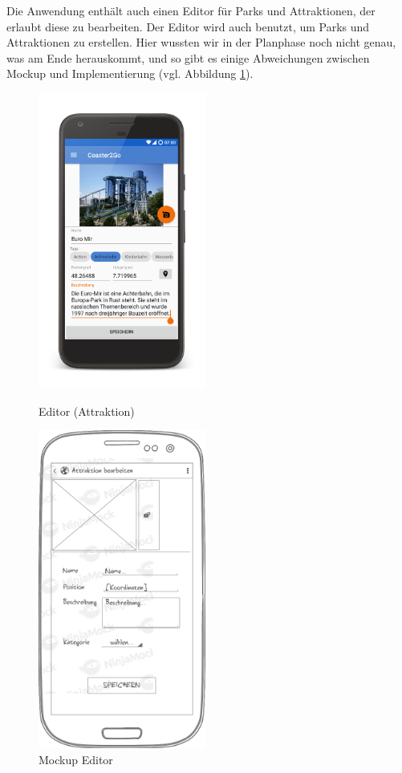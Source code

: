 Die Anwendung enthält auch einen Editor für Parks und Attraktionen, der erlaubt diese zu 
bearbeiten. Der Editor wird auch benutzt, um Parks und Attraktionen zu erstellen. Hier wussten wir 
in der Planphase noch nicht genau, was am Ende herauskommt, und so gibt es einige Abweichungen 
zwischen Mockup und Implementierung (vgl. Abbildung \ref{figure:implementierungeditor}).


\begin{figure}[h]
	\centering
	\begin{minipage}{0.49\textwidth}
		\centering
		\includegraphics[width=0.49\textwidth, trim=150 200 200 200, 
		clip]{img/screenshots/ss_attraktion_edit.png}
		\caption{Editor (Attraktion)}
		\label{figure:implementierungeditor}
	\end{minipage}
	\begin{minipage}{0.49\textwidth}
		\centering
		\includegraphics[width=0.49\textwidth]{img/mockups/m_editor.png}
		\caption{Mockup Editor}
	\end{minipage}
\end{figure}



















